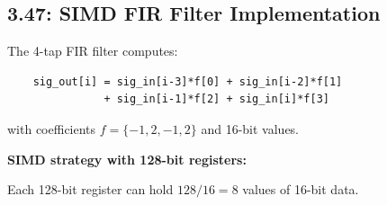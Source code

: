 \subsection*{3.47: SIMD FIR Filter Implementation}
\hypertarget{sol-3.47}{}

The 4-tap FIR filter computes:
\begin{verbatim}
    sig_out[i] = sig_in[i-3]*f[0] + sig_in[i-2]*f[1]
               + sig_in[i-1]*f[2] + sig_in[i]*f[3]
\end{verbatim}
with coefficients $f = \{-1, 2, -1, 2\}$ and 16-bit values.

\medskip\noindent\textbf{SIMD strategy with 128-bit registers:}

Each 128-bit register can hold $128/16 = 8$ values of 16-bit data.


